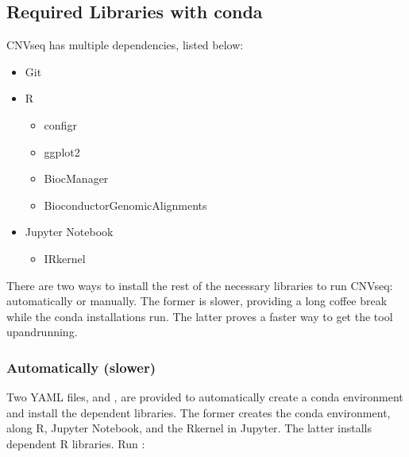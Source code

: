 \documentclass[letterpaper,10pt,english]{sphinxhowto}
\begin{document}
\subsection{Required Libraries with conda}
\label{\detokenize{index:required-libraries-with-conda}}
\sphinxAtStartPar
CNV\sphinxhyphen{}seq has multiple dependencies, listed below:
\begin{itemize}
\item {} 
\sphinxAtStartPar
Git

\item {} 
\sphinxAtStartPar
R
\begin{itemize}
\item {} 
\sphinxAtStartPar
configr

\item {} 
\sphinxAtStartPar
ggplot2

\item {} 
\sphinxAtStartPar
BiocManager

\item {} 
\sphinxAtStartPar
Bioconductor\sphinxhyphen{}GenomicAlignments

\end{itemize}

\item {} 
\sphinxAtStartPar
Jupyter Notebook
\begin{itemize}
\item {} 
\sphinxAtStartPar
IRkernel

\end{itemize}

\end{itemize}

\sphinxAtStartPar
There are two ways to install the rest of the necessary libraries to run CNV\sphinxhyphen{}seq: automatically or manually. The former is slower, providing a long coffee break while the conda installations run. The latter proves a faster way to get the tool up\sphinxhyphen{}and\sphinxhyphen{}running.


\subsubsection{Automatically (slower)}
\label{\detokenize{index:automatically-slower}}
\sphinxAtStartPar
Two YAML files,  and , are provided to automatically create a conda environment and install the dependent libraries. The former creates the conda environment, along R, Jupyter Notebook, and the R\sphinxhyphen{}kernel in Jupyter. The latter installs dependent R libraries. Run :
\end{document}
